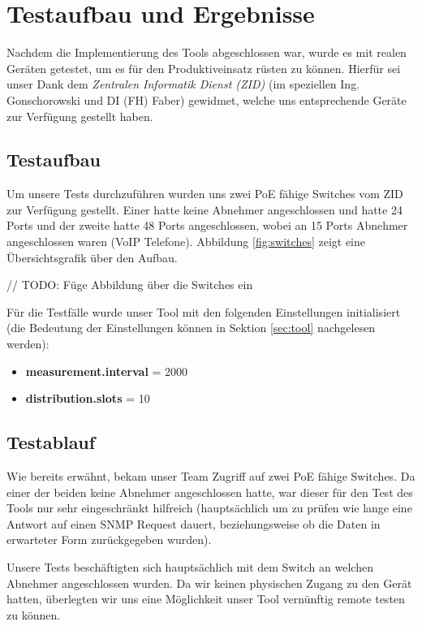 \section{Testaufbau und Ergebnisse}
\label{sec:test}
Nachdem die Implementierung des Tools abgeschlossen war, wurde es mit realen Geräten getestet, um es für den Produktiveinsatz rüsten zu können. Hierfür sei unser Dank dem \emph{Zentralen Informatik Dienst (ZID)} (im speziellen Ing. Gonschorowski und DI (FH) Faber) gewidmet, welche uns entsprechende Geräte zur Verfügung gestellt haben.

\subsection{Testaufbau}
Um unsere Tests durchzuführen wurden uns zwei PoE fähige Switches vom ZID zur Verfügung gestellt. Einer hatte keine Abnehmer angeschlossen und hatte 24 Ports und der zweite hatte 48 Ports angeschlossen, wobei an 15 Ports Abnehmer angeschlossen waren (VoIP Telefone). Abbildung \ref{fig:switches} zeigt eine Übersichtsgrafik über den Aufbau.

// TODO: Füge Abbildung über die Switches ein

Für die Testfälle wurde unser Tool mit den folgenden Einstellungen initialisiert (die Bedeutung der Einstellungen können in Sektion \ref{sec:tool} nachgelesen werden):
\begin{itemize}
 \item \textbf{measurement.interval} = 2000
 \item \textbf{distribution.slots} = 10
\end{itemize}

\subsection{Testablauf}
Wie bereits erwähnt, bekam unser Team Zugriff auf zwei PoE fähige Switches. Da einer der beiden keine Abnehmer angeschlossen hatte, war dieser für den Test des Tools nur sehr eingeschränkt hilfreich (hauptsächlich um zu prüfen wie lange eine Antwort auf einen SNMP Request dauert, beziehungsweise ob die Daten in erwarteter Form zurückgegeben wurden).

Unsere Tests beschäftigten sich hauptsächlich mit dem Switch an welchen Abnehmer angeschlossen wurden. Da wir keinen physischen Zugang zu den Gerät hatten, überlegten wir uns eine Möglichkeit unser Tool vernünftig remote testen zu können.

